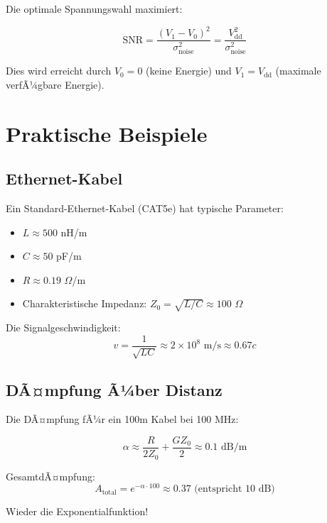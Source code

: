 ﻿\documentclass[12pt,a4paper]{article}
\theoremstyle{definition}
\theoremstyle{remark}
\begin{document}
Die optimale Spannungswahl maximiert:

\begin{equation}
\text{SNR} = \frac{(V_1 - V_0)^2}{\sigma_{\text{noise}}^2} = \frac{V_{\text{dd}}^2}{\sigma_{\text{noise}}^2}
\end{equation}

Dies wird erreicht durch $V_0 = 0$ (keine Energie) und $V_1 = V_{\text{dd}}$ (maximale verfÃ¼gbare Energie).

\section{Praktische Beispiele}

\subsection{Ethernet-Kabel}

Ein Standard-Ethernet-Kabel (CAT5e) hat typische Parameter:
\begin{itemize}
\item $L \approx 500$ nH/m
\item $C \approx 50$ pF/m
\item $R \approx 0.19$ $\Omega$/m
\item Charakteristische Impedanz: $Z_0 = \sqrt{L/C} \approx 100$ $\Omega$
\end{itemize}

Die Signalgeschwindigkeit:
\begin{equation}
v = \frac{1}{\sqrt{LC}} \approx 2 \times 10^8 \text{ m/s} \approx 0.67c
\end{equation}

\subsection{DÃ¤mpfung Ã¼ber Distanz}

Die DÃ¤mpfung fÃ¼r ein 100m Kabel bei 100 MHz:

\begin{equation}
\alpha \approx \frac{R}{2Z_0} + \frac{GZ_0}{2} \approx 0.1 \text{ dB/m}
\end{equation}

GesamtdÃ¤mpfung:
\begin{equation}
A_{\text{total}} = e^{-\alpha \cdot 100} \approx 0.37 \text{ (entspricht 10 dB)}
\end{equation}

Wieder die Exponentialfunktion!
\end{document}
